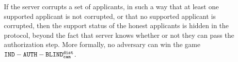 \begin{lemmaE}\label{lem:blindAuthBlindCanDist}
  If the server corrupts a set of applicants, in such a way that at least one supported applicant is not corrupted, or that no supported applicant is corrupted, then the support status of the honest applicants is hidden in the \authBlindCanDist{} protocol, beyond the fact that server knows whether or not they can pass the authorization step. More formally, no adversary can win the game $ {\tt IND- {\tt AUTH-BLIND}^{\tt dist}_{\tt can} {}} $. %
    {\normalfont {}}
\end{lemmaE}
